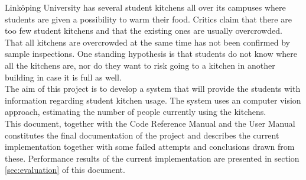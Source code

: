 Linköping University has several student kitchens all over its campuses where students are given a possibility to warm their food. Critics claim that there are too few student kitchens and that the existing ones are usually overcrowded. That all kitchens are overcrowded at the same time has not been confirmed by sample inspections. One standing hypothesis is that students do not know where all the kitchens are, nor do they want to risk going to a kitchen in another building in case it is full as well.\\

The aim of this project is to develop a system that will provide the students with information regarding student kitchen usage. The system uses an computer vision approach, estimating the number of people currently using the kitchens.\\

This document, together with the Code Reference Manual and the User Manual constitutes the final documentation of the project and describes the current implementation together with some failed attempts and conclusions drawn from these. Performance results of the current implementation are presented in section \ref{sec:evaluation} of this document.
